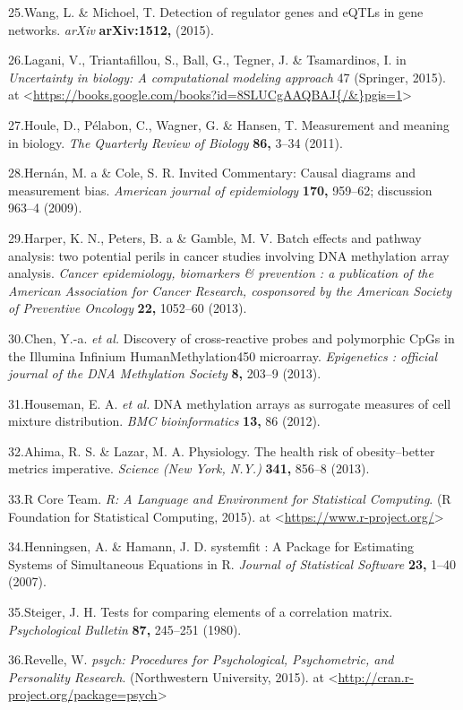 \documentclass[]{article}
\begin{document}
25.Wang, L. \& Michoel, T. Detection of regulator genes and eQTLs in
gene networks. \emph{arXiv} \textbf{arXiv:1512,} (2015).

26.Lagani, V., Triantafillou, S., Ball, G., Tegner, J. \& Tsamardinos,
I. in \emph{Uncertainty in biology: A computational modeling approach}
47 (Springer, 2015). at
\textless{}\url{https://books.google.com/books?id=8SLUCgAAQBAJ\{/\&\}pgis=1}\textgreater{}

27.Houle, D., P{é}labon, C., Wagner, G. \& Hansen, T. Measurement and
meaning in biology. \emph{The Quarterly Review of Biology} \textbf{86,}
3--34 (2011).

28.Hern{á}n, M. a \& Cole, S. R. Invited Commentary: Causal diagrams and
measurement bias. \emph{American journal of epidemiology} \textbf{170,}
959--62; discussion 963--4 (2009).

29.Harper, K. N., Peters, B. a \& Gamble, M. V. Batch effects and
pathway analysis: two potential perils in cancer studies involving DNA
methylation array analysis. \emph{Cancer epidemiology, biomarkers \&
prevention : a publication of the American Association for Cancer
Research, cosponsored by the American Society of Preventive Oncology}
\textbf{22,} 1052--60 (2013).

30.Chen, Y.-a. \emph{et al.} Discovery of cross-reactive probes and
polymorphic CpGs in the Illumina Infinium HumanMethylation450
microarray. \emph{Epigenetics : official journal of the DNA Methylation
Society} \textbf{8,} 203--9 (2013).

31.Houseman, E. A. \emph{et al.} DNA methylation arrays as surrogate
measures of cell mixture distribution. \emph{BMC bioinformatics}
\textbf{13,} 86 (2012).

32.Ahima, R. S. \& Lazar, M. A. Physiology. The health risk of
obesity--better metrics imperative. \emph{Science (New York, N.Y.)}
\textbf{341,} 856--8 (2013).

33.R Core Team. \emph{R: A Language and Environment for Statistical
Computing}. (R Foundation for Statistical Computing, 2015). at
\textless{}\url{https://www.r-project.org/}\textgreater{}

34.Henningsen, A. \& Hamann, J. D. systemfit : A Package for Estimating
Systems of Simultaneous Equations in R. \emph{Journal of Statistical
Software} \textbf{23,} 1--40 (2007).

35.Steiger, J. H. Tests for comparing elements of a correlation matrix.
\emph{Psychological Bulletin} \textbf{87,} 245--251 (1980).

36.Revelle, W. \emph{psych: Procedures for Psychological, Psychometric,
and Personality Research}. (Northwestern University, 2015). at
\textless{}\url{http://cran.r-project.org/package=psych}\textgreater{}
\end{document}
